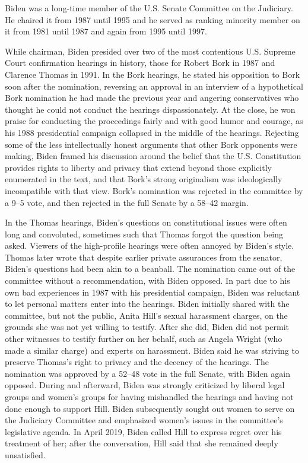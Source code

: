 Biden was a long-time member of the U.S. Senate Committee on the
Judiciary. He chaired it from 1987 until 1995 and he served as ranking
minority member on it from 1981 until 1987 and again from 1995 until
1997.

While chairman, Biden presided over two of the most contentious U.S.
Supreme Court confirmation hearings in history, those for Robert Bork in
1987 and Clarence Thomas in 1991. In the Bork hearings, he stated his
opposition to Bork soon after the nomination, reversing an approval in
an interview of a hypothetical Bork nomination he had made the previous
year and angering conservatives who thought he could not conduct the
hearings dispassionately. At the close, he won praise for conducting the
proceedings fairly and with good humor and courage, as his 1988
presidential campaign collapsed in the middle of the hearings. Rejecting
some of the less intellectually honest arguments that other Bork
opponents were making, Biden framed his discussion around the belief
that the U.S. Constitution provides rights to liberty and privacy that
extend beyond those explicitly enumerated in the text, and that Bork's
strong originalism was ideologically incompatible with that view. Bork's
nomination was rejected in the committee by a 9--5 vote, and then
rejected in the full Senate by a 58--42 margin.

In the Thomas hearings, Biden's questions on constitutional issues were
often long and convoluted, sometimes such that Thomas forgot the
question being asked. Viewers of the high-profile hearings were often
annoyed by Biden's style. Thomas later wrote that despite earlier
private assurances from the senator, Biden's questions had been akin to
a beanball. The nomination came out of the committee without a
recommendation, with Biden opposed. In part due to his own bad
experiences in 1987 with his presidential campaign, Biden was reluctant
to let personal matters enter into the hearings. Biden initially shared
with the committee, but not the public, Anita Hill's sexual harassment
charges, on the grounds she was not yet willing to testify. After she
did, Biden did not permit other witnesses to testify further on her
behalf, such as Angela Wright (who made a similar charge) and experts on
harassment. Biden said he was striving to preserve Thomas's right to
privacy and the decency of the hearings. The nomination was approved by
a 52--48 vote in the full Senate, with Biden again opposed. During and
afterward, Biden was strongly criticized by liberal legal groups and
women's groups for having mishandled the hearings and having not done
enough to support Hill. Biden subsequently sought out women to serve on
the Judiciary Committee and emphasized women's issues in the committee's
legislative agenda. In April 2019, Biden called Hill to express regret
over his treatment of her; after the conversation, Hill said that she
remained deeply unsatisfied.

